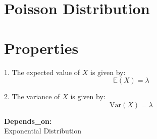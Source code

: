 \documentclass{article}
\begin{document}
\section*{Poisson Distribution}

\section*{Properties}

1. The expected value of \( X \) is given by:
   \[
   \mathbb{E}(X) = \lambda
   \]

2. The variance of \( X \) is given by:
   \[
   \text{Var}(X) = \lambda
   \]

\textbf{Depends\_on:} \\
Exponential Distribution
\end{document}
